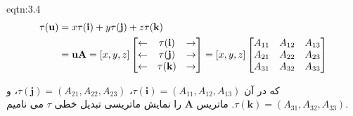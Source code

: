 {\begin{spacing}{1.5}
\begin{eqtn}{eqtn:3.4}
            \begin{equation*}
                \centering
                \begin{split}
                    \tau(\textbf{u})&=x\tau(\textbf{i})+y\tau(\textbf{j})+z\tau(\textbf{k}) \\
                    &=\textbf{uA}=[x,y,z]\begin{bmatrix}
                                             \leftarrow & \tau(\textbf{i}) & \rightarrow \\
                                             \leftarrow & \tau(\textbf{j}) & \rightarrow \\
                                             \leftarrow & \tau(\textbf{k}) & \rightarrow
                    \end{bmatrix}=[x,y,z]\begin{bmatrix}
                                             A_{11} & A_{12} & A_{13} \\
                                             A_{21} & A_{22} & A_{23} \\
                                             A_{31} & A_{32} & A_{33}
                    \end{bmatrix}
                \end{split}
            \end{equation*}
        \end{eqtn}

        که در آن $\tau(\textbf{i})=(A_{11},A_{12},A_{13})$، $\tau(\textbf{j})=(A_{21},A_{22},A_{23})$، و $\tau(\textbf{k})=(A_{31},A_{32},A_{33})$.
        ماتریس $\textbf{A}$ را نمایش ماتریسی تبدیل خطی $\tau$ می نامیم.
    \end{spacing}
}


